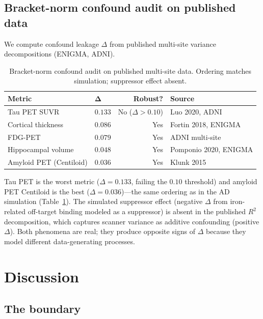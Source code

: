\documentclass{article}
\begin{document}
\subsection{Bracket-norm confound audit on published data}
\label{sec:realdata-confound}

We compute confound leakage $\Delta$ from published multi-site variance decompositions (ENIGMA, ADNI).

\begin{table}[t]
\centering
\caption{Bracket-norm confound audit on published multi-site data. Ordering matches simulation; suppressor effect absent.}
\label{tab:realdata-confound}
\small
\begin{tabular}{@{}llrl@{}}
\toprule
\textbf{Metric} & $\boldsymbol{\Delta}$ & \textbf{Robust?} & \textbf{Source} \\
\midrule
Tau PET SUVR & $0.133$ & No ($\Delta > 0.10$) & Luo 2020, ADNI \\
Cortical thickness & $0.086$ & Yes & Fortin 2018, ENIGMA \\
FDG-PET & $0.079$ & Yes & ADNI multi-site \\
Hippocampal volume & $0.048$ & Yes & Pomponio 2020, ENIGMA \\
Amyloid PET (Centiloid) & $0.036$ & Yes & Klunk 2015 \\
\bottomrule
\end{tabular}
\end{table}

Tau PET is the worst metric ($\Delta = 0.133$, failing the $0.10$ threshold) and amyloid PET Centiloid is the best ($\Delta = 0.036$)---the same ordering as in the AD simulation (Table~\ref{tab:realdata-confound}). The simulated suppressor effect (negative $\Delta$ from iron-related off-target binding modeled as a suppressor) is absent in the published $R^2$ decomposition, which captures scanner variance as additive confounding (positive $\Delta$). Both phenomena are real; they produce opposite signs of $\Delta$ because they model different data-generating processes.

\section{Discussion}
\label{sec:discussion}

\subsection{The boundary}
\end{document}

